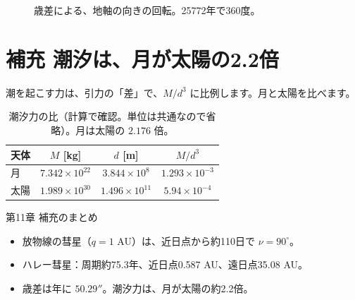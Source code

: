 \documentclass[a4paper,11pt,openany]{ltjsbook}
\begin{document}
\begin{figure}[htbp]
\centering
{}
\caption{歳差による、地軸の向きの回転。25772年で360度。}
\end{figure}

\section{補充 潮汐は、月が太陽の2.2倍}

潮を起こす力は、引力の「差」で、$M/d^3$ に比例します。月と太陽を比べます。

\begin{table}[htbp]
\centering
\begin{tabular}{lccc}
\toprule
天体 & $M$ [kg] & $d$ [m] & $M/d^3$\\
\midrule
月 & $7.342\times10^{22}$ & $3.844\times10^{8}$ & $1.293\times10^{-3}$\\
太陽 & $1.989\times10^{30}$ & $1.496\times10^{11}$ & $5.94\times10^{-4}$\\
\bottomrule
\end{tabular}
\caption{潮汐力の比（計算で確認。単位は共通なので省略）。月は太陽の $2.176$ 倍。}
\end{table}

\begin{pointbox}{第11章 補充のまとめ}
\begin{itemize}[leftmargin=*]
\item 放物線の彗星（$q=1$ AU）は、近日点から約110日で $\nu=90^\circ$。
\item ハレー彗星：周期約75.3年、近日点0.587 AU、遠日点35.08 AU。
\item 歳差は年に $50.29''$。潮汐力は、月が太陽の約2.2倍。
\end{itemize}
\end{pointbox}
\end{document}
